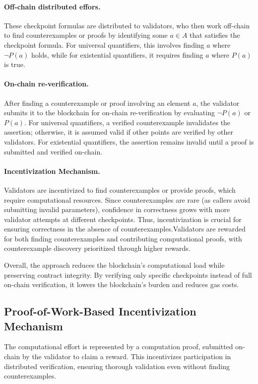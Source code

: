 \documentclass[runningheads]{llncs}
\begin{document}
\paragraph{\textbf{Off-chain distributed effors.}} These checkpoint formulas are distributed to validators, who then work off-chain to find counterexamples or proofs by identifying some \( a \in A \) that satisfies the checkpoint formula. For universal quantifiers, this involves finding \( a \) where \( \neg P(a) \) holds, while for existential quantifiers, it requires finding \( a \) where \( P(a) \) is true.
\paragraph{\textbf{On-chain re-verification.}} After finding a counterexample or proof involving an element \( a \), the validator submits it to the blockchain for on-chain re-verification by evaluating \( \neg P(a) \) or \( P(a) \). For universal quantifiers, a verified counterexample invalidates the assertion; otherwise, it is assumed valid if other points are verified by other validators. For existential quantifiers, the assertion remains invalid until a proof is submitted and verified on-chain.
\paragraph{\textbf{Incentivization Mechanism.}} Validators are incentivized to find counterexamples or provide proofs, which require computational resources. Since counterexamples are rare (as callers avoid submitting invalid parameters), confidence in correctness grows with more validator attempts at different checkpoints. Thus, incentivization is crucial for ensuring correctness in the absence of counterexamples.Validators are rewarded for both finding counterexamples and contributing computational proofs, with  counterexample discovery prioritized through higher rewards. 

Overall, the approach reduces the blockchain's computational load while preserving contract integrity. By verifying only specific checkpoints instead of full on-chain verification, it lowers the blockchain's burden and reduces gas costs.
\subsection{Proof-of-Work-Based Incentivization Mechanism}
The computational effort is represented by a computation proof, submitted on-chain by the validator to claim a reward. This incentivizes participation in distributed verification, ensuring thorough validation even without finding counterexamples.
\end{document}

